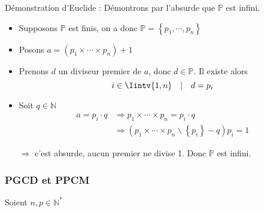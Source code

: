 \documentclass{report}
\newcommand{\N}{\mathbb{N}}
\begin{document}
\begin{itemize}
            \begin{tcolorbox}[colback=white, colframe=black, boxrule=0.8pt, width=1\textwidth]
              Démonstration d'Euclide : Démontrons par l'absurde que $\mathbb{P}$ est infini.
              \begin{itemize}[label=$\rightarrow$]
                \item Supposons $\mathbb{P}$ est finis, on a donc $\mathbb{P} = \left\{p_1, \cdots, p_n\right\}$
                \item Posons $a = (p_1 \times \cdots \times p_n) + 1$
                \item Prenons $d$ un diviseur premier de $a$, donc $d\in\mathbb{P}$. Il existe alors \[i\in\Iintv{1,n} \quad | \quad d=p_i\]
                \item Soit $q\in\N$
                  \begin{align*}
                    a = p_i\cdot q &\Rightarrow p_1 \times \cdots \times p_n = p_i\cdot q\\
                                                &\Rightarrow (p_1 \times \cdots \times p_n\backslash\left\{p_i\right\} - q)p_i = 1
                  \end{align*}
                \item[$\Rightarrow$] c'est absurde, aucun premier ne divise 1. Donc $\mathbb{P}$ est infini.
              \end{itemize}


           \end{tcolorbox} 
        \end{itemize}

      \subsubsection{PGCD et PPCM}
        
        Soient $n,p\in\N^*$
\end{document}
